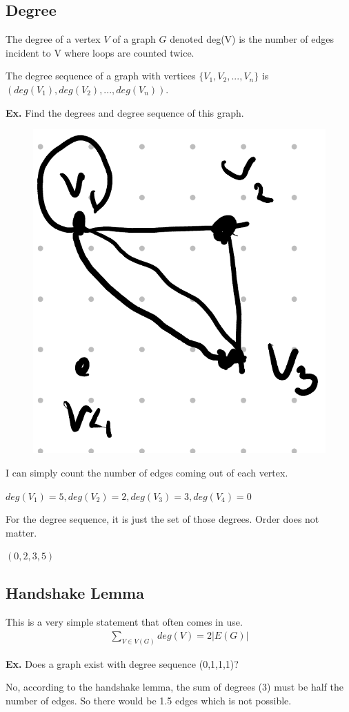 \documentclass[12pt,letterpaper]{article} \usepackage{amsmath} \usepackage{graphicx}  \usepackage{longtable}  \usepackage{amssymb}
\begin{document}
        \subsection{Degree}
        The degree of a vertex $V$ of a graph $G$ denoted deg(V) is the number of edges incident to V where loops are counted twice. 

        The degree sequence of a graph with vertices $\{V_1, V_2, ..., V_n\}$ is $(deg(V_1), deg(V_2), ..., deg(V_n))$.

        \begin{mdframed}
            \textbf{Ex. } Find the degrees and degree sequence of this graph.
            \begin{figure}[H]
                \centering
                \includegraphics[width=0.15\linewidth]{ex8.png}
            \end{figure}

            I can simply count the number of edges coming out of each vertex. 

            $deg(V_1) = 5, deg(V_2) = 2, deg(V_3) = 3, deg(V_4) = 0$

            For the degree sequence, it is just the set of those degrees. Order does not matter.

            $(0,2,3,5)$

        \end{mdframed}

        \subsection{Handshake Lemma}
        This is a very simple statement that often comes in use. 
        \begin{align*}
            \sum_{V\in V(G)} deg(V) = 2|E(G)|
        \end{align*}

        \begin{mdframed}
            \textbf{Ex. } Does a graph exist with degree sequence (0,1,1,1)?

            No, according to the handshake lemma, the sum of degrees (3) must be half the number of edges. So there would be 1.5 edges which is not possible.
        \end{mdframed}
\end{document}
